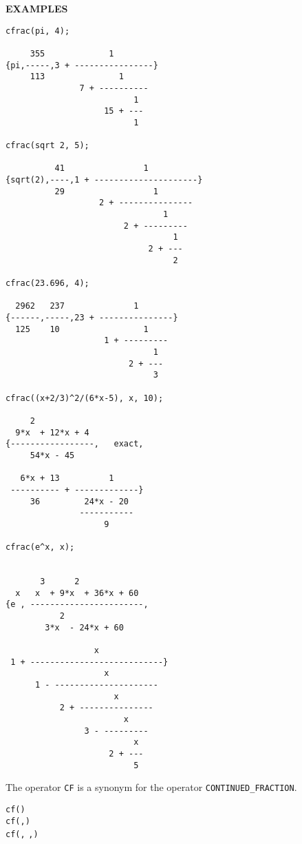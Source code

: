 \large{\textbf{EXAMPLES}}
\begin{verbatim}
cfrac(pi, 4);

     355             1
{pi,-----,3 + ----------------}
     113               1
               7 + ----------
                          1
                    15 + ---
                          1

cfrac(sqrt 2, 5);

          41                1
{sqrt(2),----,1 + ---------------------}
          29                  1
                   2 + ---------------
                                1
                        2 + ---------
                                  1
                             2 + ---
                                  2

cfrac(23.696, 4);

  2962   237              1
{------,-----,23 + ---------------}
  125    10                 1
                    1 + ---------
                              1
                         2 + ---
                              3

cfrac((x+2/3)^2/(6*x-5), x, 10);

     2
  9*x  + 12*x + 4
{-----------------,   exact,
     54*x - 45

   6*x + 13          1
 ---------- + -------------}
     36         24*x - 20
               -----------
                    9

cfrac(e^x, x);


       3      2
  x   x  + 9*x  + 36*x + 60
{e , -----------------------,
           2
        3*x  - 24*x + 60

                  x
 1 + ---------------------------}
                    x
      1 - ---------------------
                      x
           2 + ---------------
                        x
                3 - ---------
                          x
                     2 + ---
                          5
\end{verbatim}

\hypertarget{CF:operator}{}

The operator \texttt{CF}  is a 
synonym for the operator \texttt{CONTINUED\_FRACTION}.
\begin{syntaxtable}
  \texttt{cf(}\texttt{)} \hspace{5mm}\\
  \texttt{cf(}\texttt{,}\texttt{)} \\
  \texttt{cf(}\texttt{,}
  \texttt{,}\texttt{)}
\end{syntaxtable}

